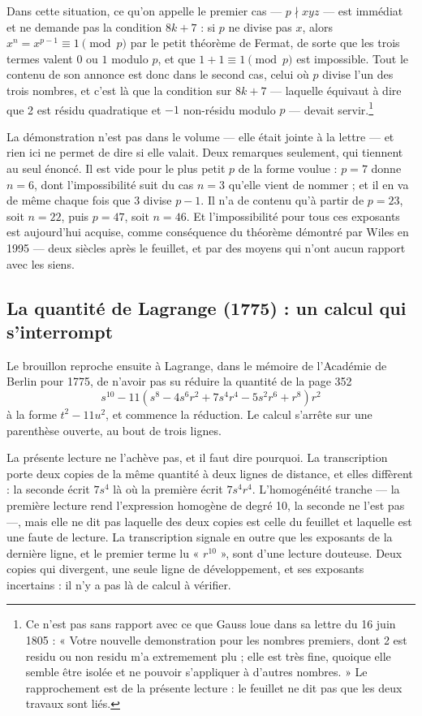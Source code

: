 \documentclass[11pt,a4paper]{article}
\begin{document}
Dans cette situation, ce qu'on appelle le premier cas — $p \nmid xyz$ — est
immédiat et ne demande pas la condition $8k+7$ : si $p$ ne divise pas $x$,
alors $x^n = x^{p-1} \equiv 1 \pmod p$ par le petit théorème de Fermat, de
sorte que les trois termes valent $0$ ou $1$ modulo $p$, et que
$1 + 1 \equiv 1 \pmod p$ est impossible. Tout le contenu de son annonce est donc dans
le second cas, celui où $p$ divise l'un des trois nombres, et c'est là que la
condition sur $8k+7$ — laquelle équivaut à dire que 2 est résidu quadratique
et $-1$ non-résidu modulo $p$ — devait servir.\footnote{Ce n'est pas sans
rapport avec ce que Gauss loue dans sa lettre du 16 juin 1805 : « Votre
nouvelle demonstration pour les nombres premiers, dont 2 est residu ou non
residu m'a extremement plu ; elle est très fine, quoique elle semble être
isolée et ne pouvoir s'appliquer à d'autres nombres. » Le rapprochement est
de la présente lecture : le feuillet ne dit pas que les deux travaux sont
liés.}

La démonstration n'est pas dans le volume — elle était jointe à la lettre — et
rien ici ne permet de dire si elle valait. Deux remarques seulement, qui
tiennent au seul énoncé. Il est vide pour le plus petit $p$ de la forme
voulue : $p = 7$ donne $n = 6$, dont l'impossibilité suit du cas $n = 3$
qu'elle vient de nommer ; et il en va de même chaque fois que $3$ divise
$p-1$. Il n'a de contenu qu'à partir de $p = 23$, soit $n = 22$, puis
$p = 47$, soit $n = 46$. Et l'impossibilité pour tous ces exposants est
aujourd'hui acquise, comme conséquence du théorème démontré par Wiles en
1995 — deux siècles après le feuillet, et par des moyens qui n'ont aucun
rapport avec les siens.

\subsection*{La quantité de Lagrange (1775) : un calcul qui s'interrompt}

Le brouillon reproche ensuite à Lagrange, dans le mémoire de l'Académie de
Berlin pour 1775, de n'avoir pas su réduire la quantité de la page 352
\[
  s^{10} - 11\left(s^8 - 4s^6r^2 + 7s^4r^4 - 5s^2r^6 + r^8\right)r^2
\]
à la forme $t^2 - 11u^2$, et commence la réduction. Le calcul s'arrête sur une
parenthèse ouverte, au bout de trois lignes.

La présente lecture ne l'achève pas, et il faut dire pourquoi. La
transcription porte deux copies de la même quantité à deux lignes de
distance, et elles diffèrent : la seconde écrit $7s^4$ là où la première écrit
$7s^4r^4$. L'homogénéité tranche — la première lecture rend l'expression
homogène de degré 10, la seconde ne l'est pas —, mais elle ne dit pas laquelle
des deux copies est celle du feuillet et laquelle est une faute de lecture. La
transcription signale en outre que les exposants de la dernière ligne, et le
premier terme lu « $r^{10}$ », sont d'une lecture douteuse. Deux copies qui
divergent, une seule ligne de développement, et ses exposants incertains : il
n'y a pas là de calcul à vérifier.
\end{document}
